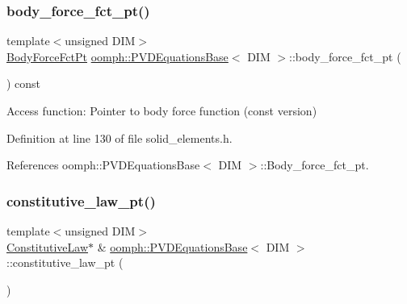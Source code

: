\subsubsection{\texorpdfstring{body\+\_\+force\+\_\+fct\+\_\+pt()}{body\_force\_fct\_pt()}\hspace{0.1cm}{\footnotesize\ttfamily [2/2]}}
{\footnotesize\ttfamily template$<$unsigned D\+IM$>$ \\
\hyperlink{classoomph_1_1PVDEquationsBase_aa0d7dc7279aff03dfcc3ad35bb6653be}{Body\+Force\+Fct\+Pt} \hyperlink{classoomph_1_1PVDEquationsBase}{oomph\+::\+P\+V\+D\+Equations\+Base}$<$ D\+IM $>$\+::body\+\_\+force\+\_\+fct\+\_\+pt (\begin{DoxyParamCaption}{ }\end{DoxyParamCaption}) const\hspace{0.3cm}{\ttfamily [inline]}}



Access function\+: Pointer to body force function (const version) 



Definition at line 130 of file solid\+\_\+elements.\+h.



References oomph\+::\+P\+V\+D\+Equations\+Base$<$ D\+I\+M $>$\+::\+Body\+\_\+force\+\_\+fct\+\_\+pt.

\mbox{\label{classoomph_1_1PVDEquationsBase_a60fa403e1d80572b36dfc93f24566bde}} 
\subsubsection{\texorpdfstring{constitutive\+\_\+law\+\_\+pt()}{constitutive\_law\_pt()}}
{\footnotesize\ttfamily template$<$unsigned D\+IM$>$ \\
\hyperlink{classoomph_1_1ConstitutiveLaw}{Constitutive\+Law}$\ast$ \& \hyperlink{classoomph_1_1PVDEquationsBase}{oomph\+::\+P\+V\+D\+Equations\+Base}$<$ D\+IM $>$\+::constitutive\+\_\+law\+\_\+pt (\begin{DoxyParamCaption}{ }\end{DoxyParamCaption})\hspace{0.3cm}{\ttfamily [inline]}}



